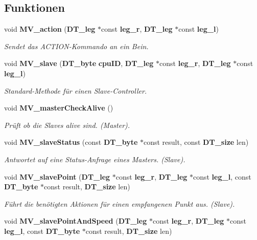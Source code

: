 \subsection*{Funktionen}
\begin{DoxyCompactItemize}
\item 
void {\bf MV\_\-action} ({\bf DT\_\-leg} $\ast$const {\bf leg\_\-r}, {\bf DT\_\-leg} $\ast$const {\bf leg\_\-l})
\begin{DoxyCompactList}\small\item\em Sendet das ACTION-\/Kommando an ein Bein. \item\end{DoxyCompactList}\item 
void {\bf MV\_\-slave} ({\bf DT\_\-byte} {\bf cpuID}, {\bf DT\_\-leg} $\ast$const {\bf leg\_\-r}, {\bf DT\_\-leg} $\ast$const {\bf leg\_\-l})
\begin{DoxyCompactList}\small\item\em Standard-\/Methode für einen Slave-\/Controller. \item\end{DoxyCompactList}\item 
void {\bf MV\_\-masterCheckAlive} ()
\begin{DoxyCompactList}\small\item\em Prüft ob die Slaves alive sind. (Master). \item\end{DoxyCompactList}\item 
void {\bf MV\_\-slaveStatus} (const {\bf DT\_\-byte} $\ast$const result, const {\bf DT\_\-size} len)
\begin{DoxyCompactList}\small\item\em Antwortet auf eine Status-\/Anfrage eines Masters. (Slave). \item\end{DoxyCompactList}\item 
void {\bf MV\_\-slavePoint} ({\bf DT\_\-leg} $\ast$const {\bf leg\_\-r}, {\bf DT\_\-leg} $\ast$const {\bf leg\_\-l}, const {\bf DT\_\-byte} $\ast$const result, {\bf DT\_\-size} len)
\begin{DoxyCompactList}\small\item\em Führt die benötigten Aktionen für einen empfangenen Punkt aus. (Slave). \item\end{DoxyCompactList}\item 
void {\bf MV\_\-slavePointAndSpeed} ({\bf DT\_\-leg} $\ast$const {\bf leg\_\-r}, {\bf DT\_\-leg} $\ast$const {\bf leg\_\-l}, const {\bf DT\_\-byte} $\ast$const result, {\bf DT\_\-size} len)

\end{DoxyCompactItemize}
